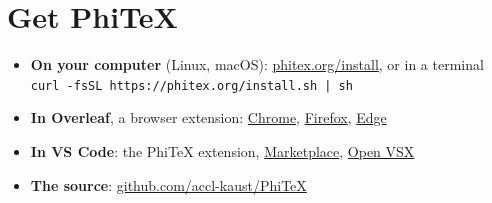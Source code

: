 \documentclass[11pt]{article}
\begin{document}
\section{Get PhiTeX}
\begin{itemize}
  \item \textbf{On your computer} (Linux, macOS):
        \href{https://phitex.org/install.html}{phitex.org/install}, or in a terminal\\
        \texttt{curl -fsSL https://phitex.org/install.sh | sh}
  \item \textbf{In Overleaf}, a browser extension:
        \href{https://chromewebstore.google.com/detail/phitex-instant-for-overle/joimneigjammmhdbgaonlepnlllceajl}{Chrome},
        \href{https://addons.mozilla.org/en-US/firefox/addon/phitex-for-overleaf-unofficial/}{Firefox},
        \href{https://microsoftedge.microsoft.com/addons/detail/phitex-instant-for-overle/gkcnpagkdjaefnnpkoogdpacdmgpihpd}{Edge}
  \item \textbf{In VS Code}: the PhiTeX extension,
        \href{https://marketplace.visualstudio.com/items?itemName=accl-kaust.phitex}{Marketplace},
        \href{https://open-vsx.org/extension/accl-kaust/phitex}{Open VSX}
  \item \textbf{The source}: \href{https://github.com/accl-kaust/PhiTeX}{github.com/accl-kaust/PhiTeX}
\end{itemize}
\end{document}

